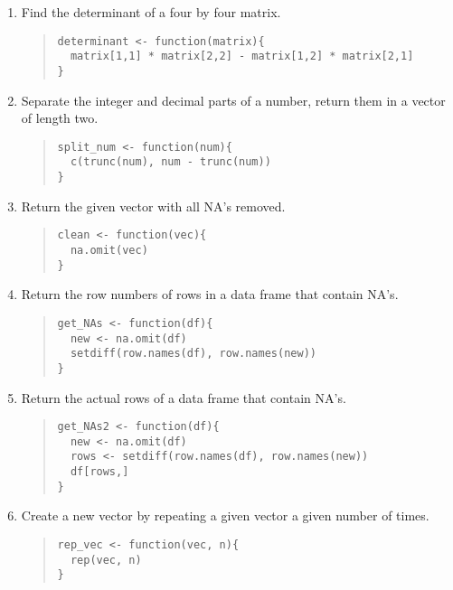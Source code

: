 \documentclass{article}
\begin{document}
\begin{enumerate}
\item Find the determinant of a four by four matrix.
  \begin{quote}
    \begin{verbatim}
determinant <- function(matrix){
  matrix[1,1] * matrix[2,2] - matrix[1,2] * matrix[2,1]
}    
    \end{verbatim}
  \end{quote}


  
\item Separate the integer and decimal parts of a number, return them in a vector of length two.
  \begin{quote}
    \begin{verbatim}
split_num <- function(num){
  c(trunc(num), num - trunc(num))
}
    \end{verbatim}
  \end{quote}

\item Return the given vector with all NA's removed.
  \begin{quote}
    \begin{verbatim}
clean <- function(vec){
  na.omit(vec)
}
    \end{verbatim}
  \end{quote}



\item Return the row numbers of rows in a data frame that contain NA's.
  \begin{quote}
    \begin{verbatim}
get_NAs <- function(df){
  new <- na.omit(df)
  setdiff(row.names(df), row.names(new))
}
    \end{verbatim}
  \end{quote}
  
\item Return the actual rows of a data frame that contain NA's.
  \begin{quote}
    \begin{verbatim}
get_NAs2 <- function(df){
  new <- na.omit(df)
  rows <- setdiff(row.names(df), row.names(new))
  df[rows,]
}
    \end{verbatim}
  \end{quote}
  

\item Create a new vector by repeating a given vector a given number of times.
  \begin{quote}
    \begin{verbatim}
rep_vec <- function(vec, n){
  rep(vec, n)	
}
    \end{verbatim}
  \end{quote}


\end{enumerate}
\end{document}
